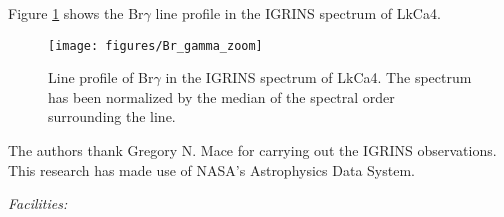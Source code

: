 \documentclass[iop,revtex4]{emulateapj}%
\newcommand{\name}{LkCa4}
\begin{document}
Figure \ref{fig:BrG} shows the Br$\gamma$ line profile in the IGRINS spectrum of \name.  

\begin{figure}
	\centering
	\texttt{[image: figures/Br\_gamma\_zoom]} 
	\caption{Line profile of Br$\gamma$ in the IGRINS spectrum of \name.  The spectrum has been normalized by the median of the spectral order surrounding the line.}
	\label{fig:BrG}
\end{figure}


\acknowledgements
The authors thank Gregory N. Mace for carrying out the IGRINS observations. This research has made use of NASA's Astrophysics Data System.

{\it Facilities:} 

\clearpage



\end{document}
